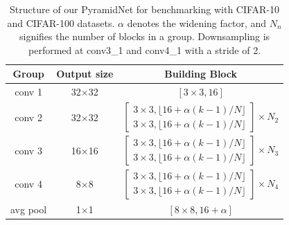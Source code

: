\documentclass[10pt,twocolumn,letterpaper]{article}
\begin{document}
\begin{table}[t]
\footnotesize
\begin{center}
\begin{tabular}{|c|c|c|}
\hline
Group & Output size & Building Block\\
\hline\hline
conv 1 & 32$\times$32 & $\left[ \textrm{3}\times\textrm{3}, \textrm{16} \right]$\\
\hline
conv 2 & 32$\times$32 & $\left[ \begin{array}{c} \textrm{3}\times\textrm{3},  \lfloor \textrm{16} + \alpha (k-1)/N \rfloor \\ \textrm{3}\times\textrm{3},  \lfloor \textrm{16} + \alpha (k-1)/N \rfloor \end{array}\right]\times N_2$\\
\hline
conv 3 & 16$\times$16 & $\left[ \begin{array}{c} \textrm{3}\times\textrm{3}, \lfloor \textrm{16} + \alpha (k-1)/N \rfloor\\ \textrm{3}\times\textrm{3},  \lfloor \textrm{16} + \alpha (k-1)/N \rfloor \end{array}\right]\times N_3$\\
\hline
conv 4 & 8$\times$8 & $\left[ \begin{array}{c} \textrm{3}\times\textrm{3}, \lfloor \textrm{16} + \alpha (k-1)/N \rfloor\\ \textrm{3}\times\textrm{3}, \lfloor  \textrm{16} + \alpha (k-1)/N \rfloor \end{array}\right]\times N_4$\\
\hline
avg pool & 1$\times$1 & $\left[8\times8, 16+\alpha\right]$\\
\hline
\end{tabular}
\end{center}
\caption{Structure of our PyramidNet for benchmarking with CIFAR-10 and CIFAR-100 datasets. $\alpha$ denotes the widening factor, and $N_n$ signifies the number of blocks in a group. Downsampling is performed at conv3\_1 and conv4\_1 with a stride of 2. %
}
\label{table:structure}
\end{table}
\end{document}
